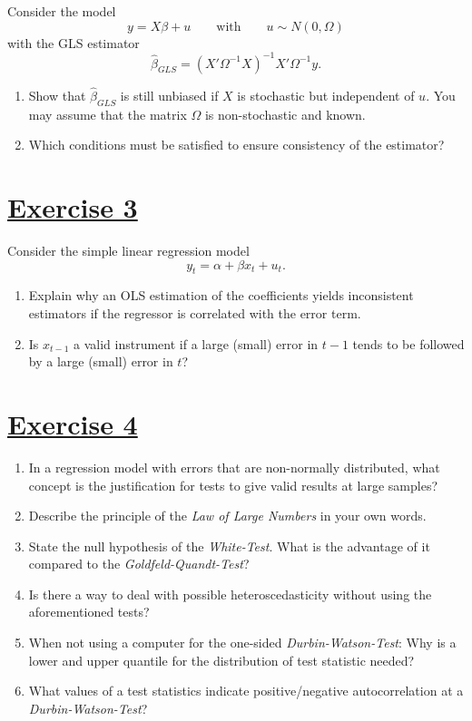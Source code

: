 \documentclass[captions=tableheading, 12pt, headings=small, parskip=half]{scrartcl}
\begin{document}
Consider the model
\[ y=X\beta+u \qquad\textrm{with}\qquad u\sim N(0,\Omega) \]
with the GLS estimator
\[ \hat\beta_{GLS}=(X'\Omega^{-1}X)^{-1}X'\Omega^{-1}y. \]
\begin{enumerate}[label = \alph*)]
	\item Show that $\hat\beta_{GLS}$ is still unbiased if
	$X$ is stochastic but independent of $u$. You may assume that the
	matrix $\Omega$ is non-stochastic and known.
	\item Which conditions must be satisfied to ensure consistency of the 
	estimator?
\end{enumerate}

\section*{\underline{Exercise 3}}

Consider the simple linear regression model
\[ y_t=\alpha+\beta x_t+u_t. \]
\begin{enumerate}[label = \alph*)]
	\item Explain why an OLS estimation of the coefficients 
	yields inconsistent estimators if the regressor is correlated 
	with the error term.
	\item Is $x_{t-1}$ a valid instrument if a large (small)
	error in $t-1$ tends to be followed by a large (small)
	error in $t$?
\end{enumerate}

\section*{\underline{Exercise 4}}
\begin{enumerate}[label = \alph*)]
	\item In a regression model with errors that are non-normally distributed, what concept is the justification for tests to give valid results at large samples?
	\item Describe the principle of the \textit{Law of Large Numbers} in your own words.
	\item State the null hypothesis of the \textit{White-Test}. What is the advantage of it compared to the \textit{Goldfeld-Quandt-Test}?
	\item Is there a way to deal with possible heteroscedasticity without using the aforementioned tests?
	\item When not using a computer for the one-sided \textit{Durbin-Watson-Test}: Why is a lower and upper quantile for the distribution of test statistic needed?
	\item What values of a test statistics indicate positive/negative autocorrelation at a \textit{Durbin-Watson-Test}?
\end{enumerate}
\end{document}
